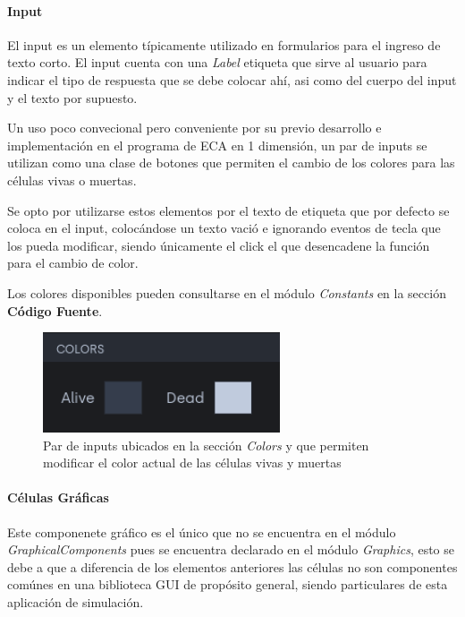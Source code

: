 \documentclass[]{article}
\begin{document}
			\paragraph{Input}
				El input es un elemento típicamente utilizado en formularios para el ingreso de texto corto. El input cuenta con una \textit{Label} etiqueta que sirve al usuario para indicar el tipo de respuesta que se debe colocar ahí, asi como del cuerpo del input y el texto por supuesto.
				
				Un uso poco convecional pero conveniente por su previo desarrollo e implementación en el programa de ECA en 1 dimensión, un par de inputs se utilizan como una clase de botones que permiten el cambio de los colores para las células vivas o muertas.
				
				Se opto por utilizarse estos elementos por el texto de etiqueta que por defecto se coloca en el input, colocándose un texto vació e ignorando eventos de tecla que los pueda modificar, siendo únicamente el click el que desencadene la función para el cambio de color.
				
				Los colores disponibles pueden consultarse en el módulo \textit{Constants} en la sección \textbf{Código Fuente}.
				
				\begin{figure}[!h]
					\centering
					\includegraphics[width=7cm]{Imagenes/colores.png}
					\caption{Par de inputs ubicados en la sección \textit{Colors} y que permiten modificar el color actual de las células vivas y muertas}
					\label{Colores_celulas}
				\end{figure}
				
			
			\paragraph{Células Gráficas}
				Este componenete gráfico es el único que no se encuentra en el módulo \textit{GraphicalComponents} pues se encuentra declarado en el módulo \textit{Graphics}, esto se debe a que a diferencia de los elementos anteriores las células no son componentes comúnes en una biblioteca GUI de propósito general, siendo particulares de esta aplicación de simulación.
				
\end{document}
